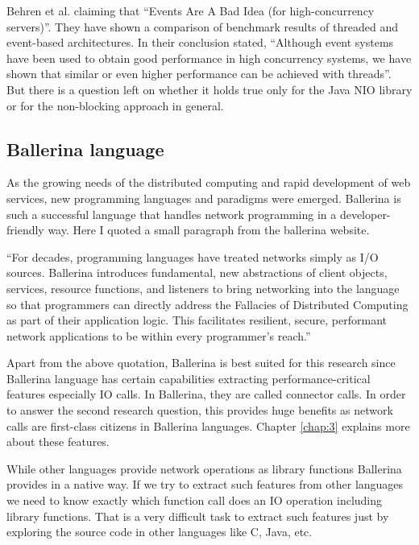 Behren et al. \cite{events_are_bad} claiming that “Events Are A Bad Idea (for high-concurrency servers)”. They have shown a comparison of benchmark results of threaded and event-based architectures. In their conclusion stated, “Although event systems have been used to obtain good performance in high concurrency systems, we have shown that similar or even higher performance can be achieved with threads”. But there is a question left on whether it holds true only for the Java \acrshort{NIO} library or for the non-blocking approach in general.

\subsection{Ballerina language}

As the growing needs of the distributed computing and rapid development of web services, new programming
languages and paradigms were emerged. Ballerina \cite{ballerina} is such a successful language that handles
network programming in a developer-friendly way. Here I quoted a small paragraph from the ballerina
website.

“For decades, programming languages have treated networks simply as I/O sources. Ballerina
introduces fundamental, new abstractions of client objects, services, resource functions, and listeners
to bring networking into the language so that programmers can directly address the Fallacies \cite{fallacies_of_distributed_computing} of
Distributed Computing as part of their application logic. This facilitates resilient, secure, performant
network applications to be within every programmer’s reach.”

Apart from the above quotation, Ballerina is best suited for this research since Ballerina language has certain capabilities extracting performance-critical features especially IO calls. In Ballerina, they are called connector calls. In order to answer the second research question, this provides huge benefits as network calls are first-class citizens in Ballerina languages. Chapter \ref{chap:3} explains more about these features.

While other languages provide network operations as library functions Ballerina provides in a native way. If we try to extract such features from other languages we need to know exactly which function call does an IO operation including library functions. That is a very difficult task to extract such features just by exploring the source code in other languages like C, Java, etc.

